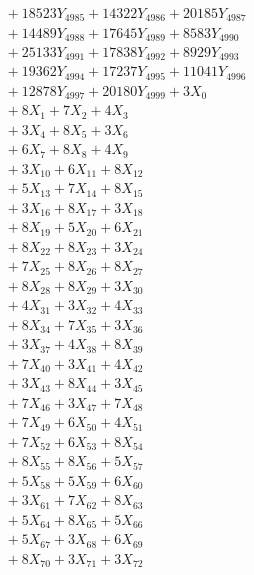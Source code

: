\documentclass[a4paper,10pt]{article}
\begin{document}
{\begin{align}
&\;  + 18523 Y_{4985} + 14322 Y_{4986} + 20185 Y_{4987} \\[0.3ex]
&\;  + 14489 Y_{4988} + 17645 Y_{4989} + 8583 Y_{4990} \\[0.3ex]
&\;  + 25133 Y_{4991} + 17838 Y_{4992} + 8929 Y_{4993} \\[0.3ex]
&\;  + 19362 Y_{4994} + 17237 Y_{4995} + 11041 Y_{4996} \\[0.3ex]
&\;  + 12878 Y_{4997} + 20180 Y_{4999} + 3 X_{0} \\[0.3ex]
&\;  + 8 X_{1} + 7 X_{2} + 4 X_{3} \\[0.3ex]
&\;  + 3 X_{4} + 8 X_{5} + 3 X_{6} \\[0.3ex]
&\;  + 6 X_{7} + 8 X_{8} + 4 X_{9} \\[0.5ex]\allowbreak
&\;  + 3 X_{10} + 6 X_{11} + 8 X_{12} \\[0.3ex]
&\;  + 5 X_{13} + 7 X_{14} + 8 X_{15} \\[0.3ex]
&\;  + 3 X_{16} + 8 X_{17} + 3 X_{18} \\[0.3ex]
&\;  + 8 X_{19} + 5 X_{20} + 6 X_{21} \\[0.3ex]
&\;  + 8 X_{22} + 8 X_{23} + 3 X_{24} \\[0.3ex]
&\;  + 7 X_{25} + 8 X_{26} + 8 X_{27} \\[0.3ex]
&\;  + 8 X_{28} + 8 X_{29} + 3 X_{30} \\[0.3ex]
&\;  + 4 X_{31} + 3 X_{32} + 4 X_{33} \\[0.3ex]
&\;  + 8 X_{34} + 7 X_{35} + 3 X_{36} \\[0.3ex]
&\;  + 3 X_{37} + 4 X_{38} + 8 X_{39} \\[0.5ex]\allowbreak
&\;  + 7 X_{40} + 3 X_{41} + 4 X_{42} \\[0.3ex]
&\;  + 3 X_{43} + 8 X_{44} + 3 X_{45} \\[0.3ex]
&\;  + 7 X_{46} + 3 X_{47} + 7 X_{48} \\[0.3ex]
&\;  + 7 X_{49} + 6 X_{50} + 4 X_{51} \\[0.3ex]
&\;  + 7 X_{52} + 6 X_{53} + 8 X_{54} \\[0.3ex]
&\;  + 8 X_{55} + 8 X_{56} + 5 X_{57} \\[0.3ex]
&\;  + 5 X_{58} + 5 X_{59} + 6 X_{60} \\[0.3ex]
&\;  + 3 X_{61} + 7 X_{62} + 8 X_{63} \\[0.3ex]
&\;  + 5 X_{64} + 8 X_{65} + 5 X_{66} \\[0.3ex]
&\;  + 5 X_{67} + 3 X_{68} + 6 X_{69} \\[0.5ex]\allowbreak
&\;  + 8 X_{70} + 3 X_{71} + 3 X_{72} \\[0.3ex]

\end{align}}
\end{document}
